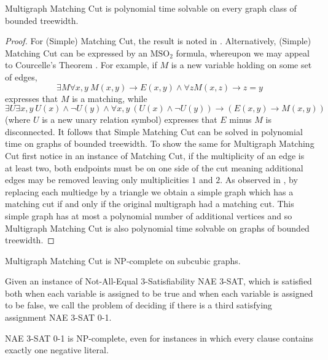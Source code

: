 \documentclass[a4paper,UKenglish,cleveref, autoref,thm-restate]{lipics-v2021}
\begin{document}
\begin{proposition}
{\sc Multigraph Matching Cut} is polynomial time solvable on every graph class of bounded treewidth.
\end{proposition}
\begin{proof}
    For {\sc (Simple) Matching Cut}, the result is noted in \cite{B09}. Alternatively, 
    {\sc (Simple) Matching Cut} can be expressed by an $\textrm{MSO}_2$ formula, whereupon we may appeal to Courcelle's Theorem \cite{Courcelle}. For example, if $M$ is a new variable holding on some set of edges, 
    \[ \exists M \forall x,y \ M(x,y) \rightarrow E(x,y) \wedge \forall z M(x,z) \rightarrow z=y\] 
    expresses that $M$ is a matching, while
    \[
    \exists U \exists x, y \ U(x) \wedge \neg U(y) \wedge \forall x, y \ (U(x) \wedge \neg U(y)) \rightarrow (E(x,y) \rightarrow M(x,y))    
    \]
    (where $U$ is a new unary relation symbol) expresses that $E$ minus $M$ is disconnected. It follows that {\sc Simple Matching Cut} can be solved in polynomial time on graphs of bounded treewidth. To show the same for {\sc Multigraph Matching Cut} first notice in an instance of {\sc Matching Cut}, if the multiplicity of an edge is at least two, both endpoints must be on one side of the cut meaning  additional edges may be removed leaving only multiplicities $1$ and $2$. As observed in \cite{MatchingCut}, by replacing each multiedge by a triangle we obtain a simple graph which has a matching cut if and only if the original multigraph had a matching cut. This simple graph has at most a polynomial number of additional vertices and so {\sc Multigraph Matching Cut} is also polynomial time solvable on graphs of bounded treewidth. %
\end{proof}

\begin{proposition}
{\sc Multigraph Matching Cut} is NP-complete on subcubic graphs.
\end{proposition}

Given an instance of {\sc Not-All-Equal $3$-Satisfiability} {\sc NAE 3-SAT}, which is satisfied both when each variable is assigned to be true and when each variable is assigned to be false, we call the problem of deciding if there is a third satisfying assignment {\sc NAE 3-SAT 0-1}.
\begin{lemma}
{\sc NAE 3-SAT 0-1} is NP-complete, even for instances in which every clause contains exactly one negative literal.
\end{lemma}
\end{document}
